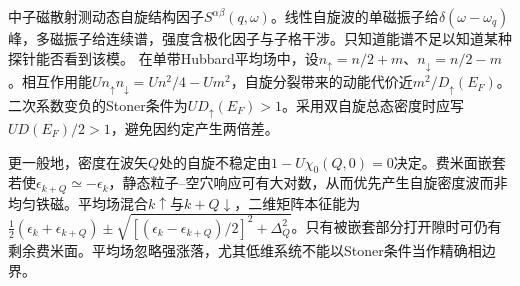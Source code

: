 中子磁散射测动态自旋结构因子$S^{\alpha\beta}(q,\omega)$。线性自旋波的单磁振子给$\delta(\omega-\omega_q)$峰，多磁振子给连续谱，强度含极化因子与子格干涉。只知道能谱不足以知道某种探针能否看到该模。
在单带Hubbard平均场中，设$n_\uparrow=n/2+m$、$n_\downarrow=n/2-m$。相互作用能$Un_\uparrow n_\downarrow=Un^2/4-Um^2$，自旋分裂带来的动能代价近$ m^2/D_\uparrow(E_F)$。二次系数变负的Stoner条件为$UD_\uparrow(E_F)>1$。采用双自旋总态密度时应写$UD(E_F)/2>1$，避免因约定产生两倍差。

更一般地，密度在波矢$Q$处的自旋不稳定由$1-U\chi_0(Q,0)=0$决定。费米面嵌套若使$\epsilon_{k+Q}\simeq-\epsilon_k$，静态粒子--空穴响应可有大对数，从而优先产生自旋密度波而非均匀铁磁。平均场混合$k\uparrow$与$k+Q\downarrow$，二维矩阵本征能为$\frac12(\epsilon_k+\epsilon_{k+Q})\pm\sqrt{[(\epsilon_k-\epsilon_{k+Q})/2]^2+\Delta_Q^2}$。只有被嵌套部分打开隙时可仍有剩余费米面。平均场忽略强涨落，尤其低维系统不能以Stoner条件当作精确相边界。
